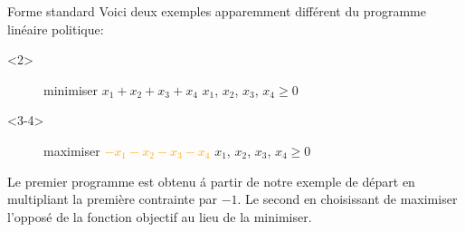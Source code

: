 \documentclass[aspectratio = 169]{beamer}
\begin{document}
\begin{frame}{Forme standard}
  Voici deux exemples apparemment diff\'erent du programme lin\'eaire
  politique:
    \begin{overlayarea}{\textwidth}{.5\textheight}
    \begin{onlyenv}<2>
    \begin{figure}
        \begin{linearProg}{
            minimiser
            }{
            $x_1 + x_2 + x_3 + x_4$
            }{
            }{
            $x_1$, $x_2$, $x_3$, $x_4 \geq 0$
            }
        \end{linearProg}
    \end{figure}
    \end{onlyenv}
    \begin{onlyenv}<3-4>
        \vspace{-1em}
    \begin{figure}
        \begin{linearProg}{
            maximiser
            }{
            \textcolor{orange}{$-x_1 - x_2 - x_3 - x_4$}
            }{
            }{
            $x_1$, $x_2$, $x_3$, $x_4 \geq 0$
            }
        \end{linearProg}
    \end{figure}
    \end{onlyenv}
    \end{overlayarea}
    \pause[4]
    Le premier programme est obtenu \'a partir de notre exemple de
    d\'epart en multipliant la premi\`ere contrainte par $-1$. Le
    second en choisissant de maximiser l'oppos\'e de la fonction
    objectif au lieu de la minimiser.
\end{frame}
\end{document}
